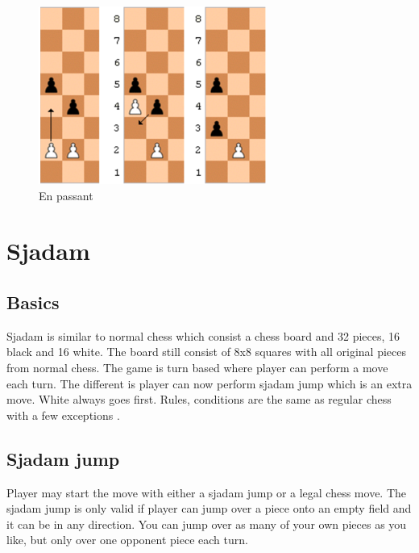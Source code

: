 \documentclass{article}
\begin{document}
\begin{figure}[!htb]
%
    \includegraphics[width=\linewidth]{chess10}
    \caption{En passant}\label{fig:chess8}
\endminipage
\end{figure}

\section*{Sjadam}
\subsection*{Basics}

Sjadam is similar to normal chess which consist a chess board and 32 pieces, 16 black and 16 white. The board still consist of 8x8 squares with all original pieces from normal chess. The game is turn based where player can perform a move each turn. The different is player can now perform sjadam jump which is an extra move. White always goes first. Rules, conditions are the same as regular chess with a few exceptions . 

\subsection*{Sjadam jump}

Player may start the move with either a sjadam jump or a legal chess move. The sjadam jump is only valid if player can jump over a piece onto an empty field and it can be in any direction. You can jump over as many of your own pieces as you like, but only over one opponent piece each turn.
\end{document}
